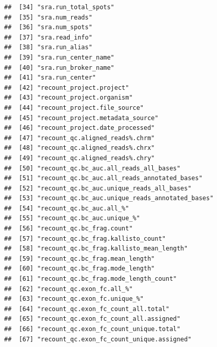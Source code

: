 \documentclass[
]{article}
\begin{document}
\begin{verbatim}
##  [34] "sra.run_total_spots"                                               
##  [35] "sra.num_reads"                                                     
##  [36] "sra.num_spots"                                                     
##  [37] "sra.read_info"                                                     
##  [38] "sra.run_alias"                                                     
##  [39] "sra.run_center_name"                                               
##  [40] "sra.run_broker_name"                                               
##  [41] "sra.run_center"                                                    
##  [42] "recount_project.project"                                           
##  [43] "recount_project.organism"                                          
##  [44] "recount_project.file_source"                                       
##  [45] "recount_project.metadata_source"                                   
##  [46] "recount_project.date_processed"                                    
##  [47] "recount_qc.aligned_reads%.chrm"                                    
##  [48] "recount_qc.aligned_reads%.chrx"                                    
##  [49] "recount_qc.aligned_reads%.chry"                                    
##  [50] "recount_qc.bc_auc.all_reads_all_bases"                             
##  [51] "recount_qc.bc_auc.all_reads_annotated_bases"                       
##  [52] "recount_qc.bc_auc.unique_reads_all_bases"                          
##  [53] "recount_qc.bc_auc.unique_reads_annotated_bases"                    
##  [54] "recount_qc.bc_auc.all_%"                                           
##  [55] "recount_qc.bc_auc.unique_%"                                        
##  [56] "recount_qc.bc_frag.count"                                          
##  [57] "recount_qc.bc_frag.kallisto_count"                                 
##  [58] "recount_qc.bc_frag.kallisto_mean_length"                           
##  [59] "recount_qc.bc_frag.mean_length"                                    
##  [60] "recount_qc.bc_frag.mode_length"                                    
##  [61] "recount_qc.bc_frag.mode_length_count"                              
##  [62] "recount_qc.exon_fc.all_%"                                          
##  [63] "recount_qc.exon_fc.unique_%"                                       
##  [64] "recount_qc.exon_fc_count_all.total"                                
##  [65] "recount_qc.exon_fc_count_all.assigned"                             
##  [66] "recount_qc.exon_fc_count_unique.total"                             
##  [67] "recount_qc.exon_fc_count_unique.assigned"                          

\end{verbatim}
\end{document}
